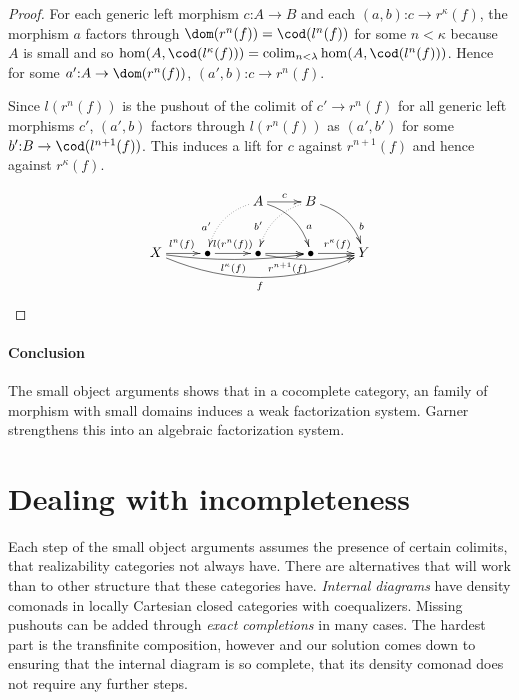 \documentclass{tac}
\newcommand\of{\mathord:}
\newcommand\colim{\mathop{\mathrm{colim}}}
\begin{document}
\begin{proof}
For each generic left morphism $c\of A \to B$ and each $(a,b)\of c\to r^\kappa(f)$, the morphism $a$ factors through $\dom(r^n(f)) = \cod(l^n(f))$ for some $n<\kappa$ because $A$ is small and so $\hom(A,\cod(l^\kappa(f))) =\colim_{n<\lambda} \hom(A,\cod(l^n(f)))$.
Hence for some $a'\of A\to \dom(r^n(f))$, $(a',b)\of c\to r^n(f)$.

Since $l(r^n(f))$ is the pushout of the colimit of $c'\to r^n(f)$ for all generic left morphisms $c'$, $(a',b)$ factors through $l(r^n(f))$ as $(a',b')$ for some $b'\of B \to \cod(l^{n+1}(f))$. This induces a lift for $c$ against $r^{n+1}(f)$ and hence against $r^\kappa(f)$.

\[\xymatrix{
&& A\ar[r]^{c}\ar@/^2ex/[dr]^(.7)a\ar@{.>}@/_2ex/[dl]_(.7){a'} & B\ar@/^2ex/[dr]^(.7)b\ar@{.>}@/_2ex/[dl]_(.7){b'} \\
X \ar[r]^{l^n(f)} \ar@/_1ex/[rrr]_{l^{\kappa}(f)} \ar@/_4ex/[rrrr]_{f} & \bullet \ar[r]^{l(r^n(f))}  & \bullet \ar[r]\ar@/_1ex/[rr]_(.3){r^{n+1}(f)} & \bullet \ar[r]^{r^\kappa(f)} & Y
}\]
\end{proof}

\paragraph{Conclusion}
The small object arguments shows that in a cocomplete category, an family of morphism with small domains induces a weak factorization system. Garner %
strengthens this into an algebraic factorization system.

\section{Dealing with incompleteness}
Each step of the small object arguments assumes the presence of certain colimits, that realizability categories not always have. There are alternatives that will work than to other structure that these categories have.
 \emph{Internal diagrams} have density comonads in locally Cartesian closed categories with coequalizers.
 Missing pushouts can be added through \emph{exact completions} in many cases.
The hardest part is the transfinite composition, however and our solution comes down to ensuring that the internal diagram is so complete, that its density comonad does not require any further steps.
\end{document}
